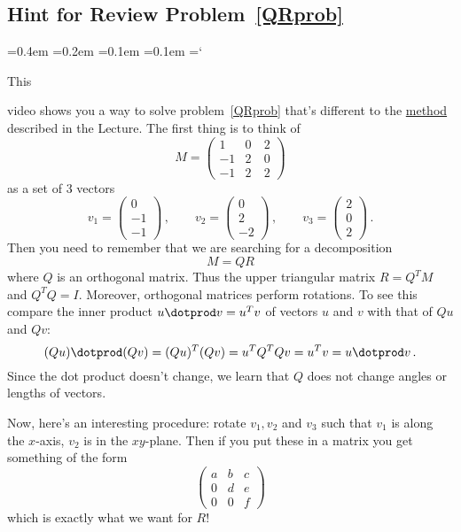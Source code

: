 \subsection*{Hint for Review Problem~\ref{QRprob}}

{\ttfamily
{}\font=0.4em
\font=0.2em
\font=0.1em
\font=0.1em
\hyphenchar\font=`\-


\hypertarget{gram_schmidt_and_orthogonal_complements_hint}{This} video shows you a way to solve problem~\ref{QRprob} 
that's different to the \hyperlink{methodQR}{method} described in the Lecture. The first thing is to think of 
$$
M=\begin{pmatrix}1 & 0 & 2 \\ -1 & 2 & 0 \\ -1 & 2 \ & 2\end{pmatrix}
$$
as a set of 3 vectors 
$$
v_1=\begin{pmatrix}0 \\ -1 \\ -1\end{pmatrix}\, ,\qquad
v_2=\begin{pmatrix}0 \\ 2 \\ -2\end{pmatrix}\, ,\qquad
v_3=\begin{pmatrix}2 \\ 0 \\ 2\end{pmatrix}\, .
$$
Then you need to remember that we are searching for a decomposition
$$M=QR$$ 
where $Q$ is an orthogonal matrix. Thus the upper triangular matrix $R = Q^T M$ and $Q^T Q = I$.
Moreover, orthogonal matrices perform rotations. To see this compare the inner product $u\dotprod v = u^T v$ of vectors $u$ and $v$
with that of $Qu$ and $Qv$:
$$
(Qu)\dotprod (Qv) = (Qu)^T (Qv) = u^T Q^T Q v = u^T v = u\dotprod v\, .
$$  
Since the dot product doesn't change, we learn that $Q$ does not change angles or lengths of vectors.

Now, here's an interesting procedure: rotate $v_1, v_2$ and $v_3$ such that $v_1$ is along the $x$-axis, $v_2$ is in the $xy$-plane.
Then if you put these in a matrix you get something of the form
$$
\begin{pmatrix}a & b & c \\ 0 & d & e \\ 0  & 0 & f\end{pmatrix}
$$
which is exactly what we want for $R$!

}
